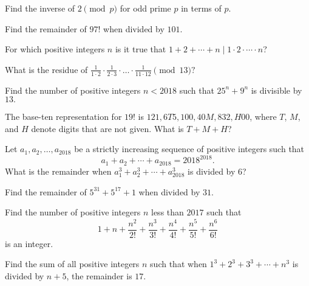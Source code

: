\documentclass[mast]{lucky}
\begin{document}
\begin{prob}[]{1}
Find the inverse of $2\pmod {p}$ for odd prime $p$ in terms of $p.$
\end{prob}
    
\begin{prob}[]{1}
Find the remainder of $97!$ when divided by $101.$
\end{prob}

\begin{prob}{2}
For which positive integers $n$ is it true that $1+2+\cdots+n\mid 1\cdot 2\cdot \cdots \cdot n$?
\end{prob}

\begin{prob}[]{2}
What is the residue of $\frac{1}{1\cdot 2}\cdot \frac{1}{2\cdot 3}\cdot \dots \cdot \frac{1}{11\cdot 12}\pmod {13}?$
\end{prob}

\begin{prob}[PUMaC 2018]{3}
Find the number of positive integers $n<2018$ such that $25^n+9^n$ is divisible by $13.$
\end{prob}

\begin{req}[AMC 10B 2019/14]{4}
The base-ten representation for $19!$ is $121,6T5,100,40M,832,H00$, where $T$, $M$, and $H$ denote digits that are not given. What is $T+M+H$?
\end{req}

\begin{prob}[AMC 10B 2018/16]{4}
Let $a_1,a_2,\dots,a_{2018}$ be a strictly increasing sequence of positive integers such that\[a_1+a_2+\cdots+a_{2018}=2018^{2018}.\]What is the remainder when $a_1^3+a_2^3+\cdots+a_{2018}^3$ is divided by $6$?
\end{prob}
    
\begin{prob}[]{4}
Find the remainder of $5^{31}+5^{17}+1$ when divided by $31.$
\end{prob}

\begin{prob}[AIME II 2017/8]{6}
Find the number of positive integers $n$ less than $2017$ such that
\[ 1+n+\frac{n^2}{2!}+\frac{n^3}{3!}+\frac{n^4}{4!}+\frac{n^5}{5!}+\frac{n^6}{6!} \]is an integer.
\end{prob}

\begin{prob}[AOIME 2020/10]{6}
Find the sum of all positive integers $n$ such that when $1^3+2^3+3^3+\cdots+n^3$ is divided by $n+5$, the remainder is $17.$
\end{prob}
\end{document}
